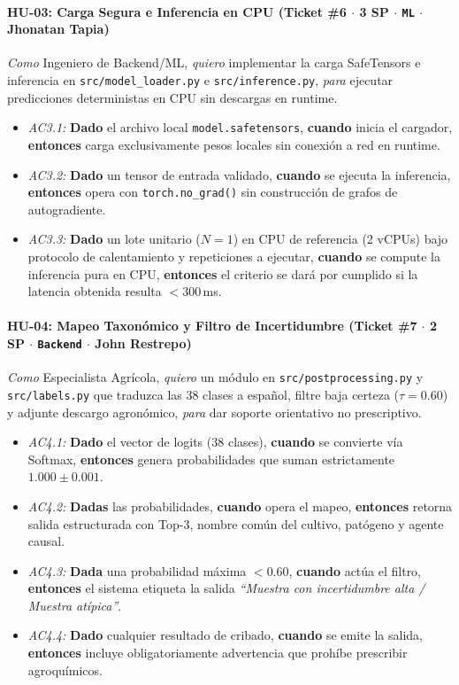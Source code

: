 \documentclass[12pt,letterpaper]{article}
\begin{document}
\paragraph{HU-03: Carga Segura e Inferencia en CPU (Ticket \#6 $\cdot$ 3 SP $\cdot$ \texttt{ML} $\cdot$ Jhonatan Tapia)}
\textit{Como} Ingeniero de Backend/ML, \textit{quiero} implementar la carga SafeTensors e inferencia en \texttt{src/model\_loader.py} e \texttt{src/inference.py}, \textit{para} ejecutar predicciones deterministas en CPU sin descargas en runtime.
\begin{itemize}[leftmargin=*,noitemsep]
    \item \textit{AC3.1:} \textbf{Dado} el archivo local \texttt{model.safetensors}, \textbf{cuando} inicia el cargador, \textbf{entonces} carga exclusivamente pesos locales sin conexión a red en runtime.
    \item \textit{AC3.2:} \textbf{Dado} un tensor de entrada validado, \textbf{cuando} se ejecuta la inferencia, \textbf{entonces} opera con \texttt{torch.no\_grad()} sin construcción de grafos de autogradiente.
    \item \textit{AC3.3:} \textbf{Dado} un lote unitario ($N=1$) en CPU de referencia (2 vCPUs) bajo protocolo de calentamiento y repeticiones a ejecutar, \textbf{cuando} se compute la inferencia pura en CPU, \textbf{entonces} el criterio se dará por cumplido si la latencia obtenida resulta $< 300$\,ms.
\end{itemize}

\paragraph{HU-04: Mapeo Taxonómico y Filtro de Incertidumbre (Ticket \#7 $\cdot$ 2 SP $\cdot$ \texttt{Backend} $\cdot$ John Restrepo)}
\textit{Como} Especialista Agrícola, \textit{quiero} un módulo en \texttt{src/}\linebreak[4]\texttt{postprocessing.py} y \texttt{src/labels.py} que traduzca las 38 clases a español, filtre baja certeza ($\tau = 0.60$) y adjunte descargo agronómico, \textit{para} dar soporte orientativo no prescriptivo.
\begin{itemize}[leftmargin=*,noitemsep]
    \item \textit{AC4.1:} \textbf{Dado} el vector de logits ($38$ clases), \textbf{cuando} se convierte vía Softmax, \textbf{entonces} genera probabilidades que suman estrictamente $1.000 \pm 0.001$.
    \item \textit{AC4.2:} \textbf{Dadas} las probabilidades, \textbf{cuando} opera el mapeo, \textbf{entonces} retorna salida estructurada con Top-$3$, nombre común del cultivo, patógeno y agente causal.
    \item \textit{AC4.3:} \textbf{Dada} una probabilidad máxima $< 0.60$, \textbf{cuando} actúa el filtro, \textbf{entonces} el sistema etiqueta la salida \textit{``Muestra con incertidumbre alta / Muestra atípica''}.
    \item \textit{AC4.4:} \textbf{Dado} cualquier resultado de cribado, \textbf{cuando} se emite la salida, \textbf{entonces} incluye obligatoriamente advertencia que prohíbe prescribir agroquímicos.
\end{itemize}
\end{document}
